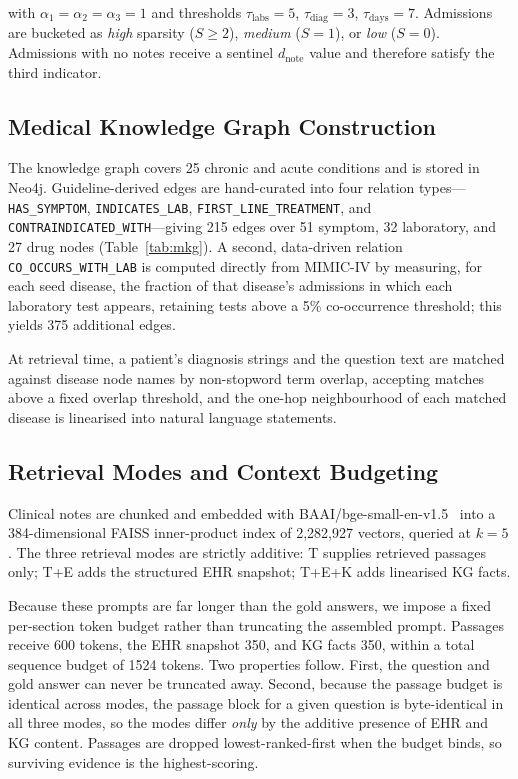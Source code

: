 \documentclass[conference]{IEEEtran}
\begin{document}
with $\alpha_1 = \alpha_2 = \alpha_3 = 1$ and thresholds
$\tau_{\text{labs}} = 5$, $\tau_{\text{diag}} = 3$,
$\tau_{\text{days}} = 7$. Admissions are bucketed as \textit{high}
sparsity ($S \geq 2$), \textit{medium} ($S = 1$), or \textit{low}
($S = 0$). Admissions with no notes receive a sentinel
$d_{\text{note}}$ value and therefore satisfy the third indicator.

\subsection{Medical Knowledge Graph Construction}
\label{sec:mkg}

The knowledge graph covers 25 chronic and acute conditions and is
stored in Neo4j. Guideline-derived edges are hand-curated into four
relation types---\texttt{HAS\_SYMPTOM}, \texttt{INDICATES\_LAB},
\texttt{FIRST\_LINE\_TREATMENT}, and
\texttt{CONTRAINDICATED\_WITH}---giving 215 edges over 51 symptom, 32
laboratory, and 27 drug nodes (Table~\ref{tab:mkg}). A second,
data-driven relation \texttt{CO\_OCCURS\_WITH\_LAB} is computed
directly from MIMIC-IV by measuring, for each seed disease, the
fraction of that disease's admissions in which each laboratory test
appears, retaining tests above a 5\% co-occurrence threshold; this
yields 375 additional edges.

At retrieval time, a patient's diagnosis strings and the question text
are matched against disease node names by non-stopword term overlap,
accepting matches above a fixed overlap threshold, and the one-hop
neighbourhood of each matched disease is linearised into natural
language statements.

\subsection{Retrieval Modes and Context Budgeting}

Clinical notes are chunked and embedded with
BAAI/bge-small-en-v1.5~\cite{bge2024} into a 384-dimensional FAISS
inner-product index of 2{,}282{,}927 vectors, queried at $k = 5$. The
three retrieval modes are strictly additive: T supplies retrieved
passages only; T+E adds the structured EHR snapshot; T+E+K adds
linearised KG facts.

Because these prompts are far longer than the gold answers, we impose
a fixed per-section token budget rather than truncating the assembled
prompt. Passages receive 600 tokens, the EHR snapshot 350, and KG
facts 350, within a total sequence budget of 1524 tokens. Two
properties follow. First, the question and gold answer can never be
truncated away. Second, because the passage budget is identical across
modes, the passage block for a given question is byte-identical in all
three modes, so the modes differ \textit{only} by the additive presence
of EHR and KG content. Passages are dropped lowest-ranked-first when
the budget binds, so surviving evidence is the highest-scoring.
\end{document}
